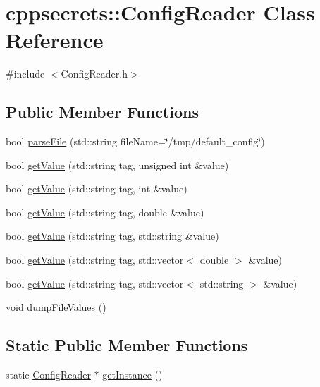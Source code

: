 \hypertarget{classcppsecrets_1_1ConfigReader}{\section{cppsecrets\-:\-:Config\-Reader Class Reference}
\label{classcppsecrets_1_1ConfigReader}
}


{\ttfamily \#include $<$Config\-Reader.\-h$>$}

\subsection*{Public Member Functions}
\begin{DoxyCompactItemize}
\item 
bool \hyperlink{classcppsecrets_1_1ConfigReader_afffd5f9aae8203d9a5a8e0bd6d66fa4e}{parse\-File} (std\-::string file\-Name=\char`\"{}/tmp/default\-\_\-config\char`\"{})
\item 
bool \hyperlink{classcppsecrets_1_1ConfigReader_a952e033776eb137d0bd10a42a7c287d9}{get\-Value} (std\-::string tag, unsigned int \&value)
\item 
bool \hyperlink{classcppsecrets_1_1ConfigReader_ae0f7c8eb8e59b056bf5f8c34e7011f96}{get\-Value} (std\-::string tag, int \&value)
\item 
bool \hyperlink{classcppsecrets_1_1ConfigReader_a583f489ef7d368e0a36cecd9e9fc01ff}{get\-Value} (std\-::string tag, double \&value)
\item 
bool \hyperlink{classcppsecrets_1_1ConfigReader_a52ef0f7c23f8fa974de583d7a98b887a}{get\-Value} (std\-::string tag, std\-::string \&value)
\item 
bool \hyperlink{classcppsecrets_1_1ConfigReader_a6721535bce113f48b476ffd7d22630d2}{get\-Value} (std\-::string tag, std\-::vector$<$ double $>$ \&value)
\item 
bool \hyperlink{classcppsecrets_1_1ConfigReader_a07267f92277cdd88200ae1826909d3fa}{get\-Value} (std\-::string tag, std\-::vector$<$ std\-::string $>$ \&value)
\item 
void \hyperlink{classcppsecrets_1_1ConfigReader_a980f4b314109eb3cd3fb32dabd8788d3}{dump\-File\-Values} ()
\end{DoxyCompactItemize}
\subsection*{Static Public Member Functions}
\begin{DoxyCompactItemize}
\item 
static \hyperlink{classcppsecrets_1_1ConfigReader}{Config\-Reader} $\ast$ \hyperlink{classcppsecrets_1_1ConfigReader_adcd7c11a5af6e062f96201302c2a90b0}{get\-Instance} ()
\end{DoxyCompactItemize}


